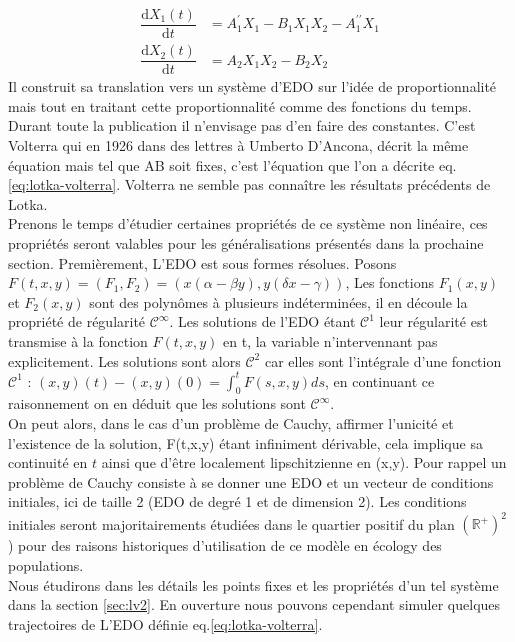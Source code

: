 \documentclass{wsdcr}
\begin{document}
\begin{equation}
\begin{aligned}
{\dfrac {\mathrm {d} X_1(t)}{\mathrm {d} t}}&=A_1^\prime X_1-B_1X_1X_2-A_1^{\prime \prime}X_1\\
{\dfrac {\mathrm {d} X_2(t)}{\mathrm {d} t}}&=A_2X_1X_2-B_2X_2
\end{aligned}
\end{equation}
Il construit sa translation vers un système d'EDO sur l'idée de proportionnalité mais tout en traitant cette proportionnalité comme des fonctions du temps. Durant toute la publication il n'envisage pas d'en faire des constantes. C'est Volterra qui en 1926 dans des lettres à Umberto D'Ancona, décrit la même équation mais tel que AB soit fixes, c'est l'équation que l'on a décrite eq.\ref{eq:lotka-volterra}. Volterra ne semble pas connaître les résultats précédents de Lotka. \cite{volterra1926} \\
Prenons le temps d'étudier certaines propriétés de ce système non linéaire, ces propriétés seront valables pour les généralisations présentés dans la prochaine section. Premièrement, L'EDO est sous formes résolues. Posons $F(t,x,y)=(F_1,F_2)=(x(\alpha -\beta y),y(\delta x-\gamma ))$, Les fonctions $F_1(x,y)$ et $F_2(x,y)$ sont des polynômes à plusieurs indéterminées, il en découle la propriété de régularité $\mathcal{C}^\infty$. Les solutions de l'EDO étant $\mathcal{C}^1$ leur régularité est transmise à la fonction $F(t,x,y)$ en t, la variable n'intervennant pas explicitement. Les solutions sont alors $\mathcal{C}^2$ car elles sont l'intégrale d'une fonction $\mathcal{C}^1$ : $(x,y)(t)-(x,y)(0)=\int_0^t F(s,x,y)ds$, en continuant ce raisonnement on en déduit que les solutions sont $\mathcal{C}^\infty$. \\
On peut alors, dans le cas d'un problème de Cauchy, affirmer l'unicité et l'existence de la solution, F(t,x,y) étant infiniment dérivable, cela implique sa continuité en $t$ ainsi que d'être localement lipschitzienne en (x,y). Pour rappel un problème de Cauchy consiste à se donner une EDO et un vecteur de conditions initiales, ici de taille 2 (EDO de degré 1 et de dimension 2). Les conditions initiales seront majoritairements étudiées dans le quartier positif du plan $(\mathbb{R}^+)^2$) pour des raisons historiques d'utilisation de ce modèle en écology des populations. \\
Nous étudirons dans les détails les points fixes et les propriétés d'un tel système dans la section \ref{sec:lv2}. En ouverture nous pouvons cependant simuler quelques trajectoires de L'EDO définie eq.\ref{eq:lotka-volterra}.
\end{document}
